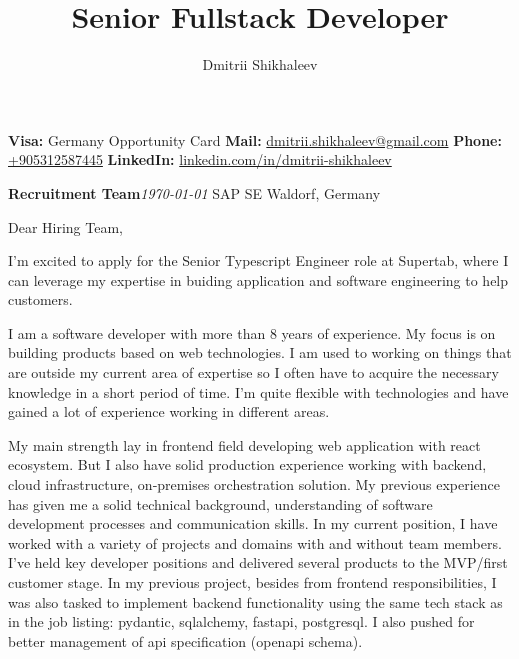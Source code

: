\documentclass[11pt, a4paper]{article}
\author{Dmitrii Shikhaleev}
\title{Senior Fullstack Developer}
\makeatletter
\newcommand{\cvdate}[1]{\small\narrower\textit{#1}}
\newcommand{\thecontacts}{
    {\bfseries{Visa:}} Germany Opportunity Card \hfill
    \hfill\hspace{0.2em} \break \hspace{0.2em}
    {\bfseries{Mail:}} \href{mailto:dmitrii.shikhaleev@gmail.com}{dmitrii.shikhaleev@gmail.com}
    \hfill\hspace{0.2em} \break \hspace{0.2em} 
    {\bfseries{Phone:}} \href{tel:+905312587445}{+905312587445}
    \hfill\hspace{0.2em} \break \hspace{0.2em}
    {\bfseries{LinkedIn:}} \href{https://www.linkedin.com/in/dmitrii-shikhaleev/}{linkedin.com/in/dmitrii-shikhaleev}
}
\renewcommand{\maketitle}{
  \noindent
  \begin{minipage}[t]{0.6\textwidth}
    {\Huge\color{ColorBlack}\textbf{\theauthor}} \hfill\vspace{0.6em}\break
    {\Large{\thetitle}} \hfill\vspace{0.8em}\break
    \thecontacts \hfill\vspace{0.4em}\break

  \end{minipage}
  \hfill
}
\newcommand{\makelettertitle}{
    \textbf{Recruitment Team}\hfill \cvdate{\today}\break
    SAP SE \hfill\break
    Waldorf, Germany
}
\makeatother
\begin{document}
\maketitle

\makelettertitle

Dear Hiring Team,

I'm excited to apply for the Senior Typescript Engineer role at Supertab, where I can leverage my expertise in buiding application and software engineering to help customers.




I am a software developer with more than 8 years of experience. My focus is on building products based on web
technologies. I am used to working on things that are outside my current area of expertise so I often have to acquire the
necessary knowledge in a short period of time. I’m quite flexible with technologies and have gained a lot of experience
working in different areas.

My main strength lay in frontend field developing web application with react ecosystem. But I also have solid production
experience working with backend, cloud infrastructure, on‐premises orchestration solution. My previous experience
has given me a solid technical background, understanding of software development processes and communication
skills. In my current position, I have worked with a variety of projects and domains with and without team members.
I’ve held key developer positions and delivered several products to the MVP/first customer stage. In my previous project, besides from frontend responsibilities, I was also tasked to implement backend functionality using the same tech stack as in the job listing: pydantic, sqlalchemy, fastapi, postgresql. I also pushed for better management of api specification (openapi schema).
\end{document}
